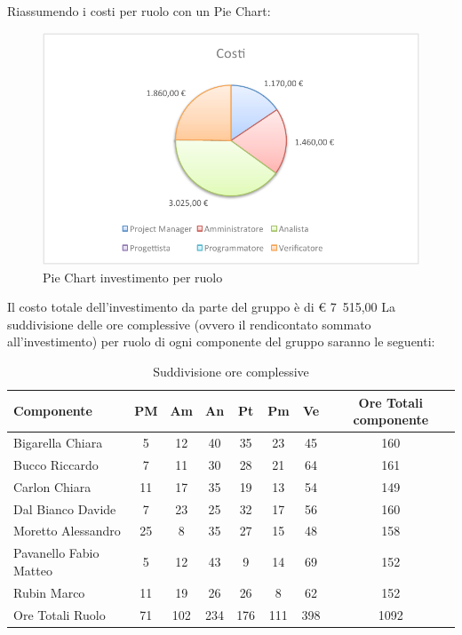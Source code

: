 				Riassumendo i costi per ruolo con un Pie Chart:
				\begin{figure}[H]\centering
					\includegraphics[width=\textwidth]{PianoDiProgetto/Pics/ChartTotCostiInvest.pdf}
					\caption{Pie Chart investimento per ruolo}
				\end{figure}
				Il costo totale dell'investimento da parte del gruppo è di \euro{} 7~515,00 
				La suddivisione delle ore complessive (ovvero il rendicontato sommato all'investimento) per ruolo di ogni componente del gruppo \groupname{} saranno le seguenti:
				\begin{table}[H]
					\begin{center}
						\begin{tabular}{| l | c | c | c | c | c | c | c |}
							\hline									
								Componente 				&PM 	&Am 	&An 	&Pt 	&Pm 	&Ve 	&Ore Totali componente	\\ \hline	
								Bigarella Chiara 		&5		&12		&40		&35		&23		&45		&160	\\	
								Bucco Riccardo 			&7		&11		&30		&28		&21		&64		&161	\\	
								Carlon Chiara 			&11		&17		&35		&19		&13		&54		&149	\\	
								Dal Bianco Davide 		&7		&23		&25		&32		&17		&56		&160	\\	
								Moretto Alessandro 		&25		&8		&35		&27		&15		&48		&158	\\	
								Pavanello Fabio Matteo 	&5		&12		&43		&9		&14		&69		&152	\\	
								Rubin Marco 			&11		&19		&26		&26		&8		&62		&152	\\\hline\hline	

								Ore Totali Ruolo		&71		&102	&234	&176	&111	&398	&1092	\\\hline	
						\end{tabular}
					\end{center}
					\caption{Suddivisione ore complessive}
				\end{table}
